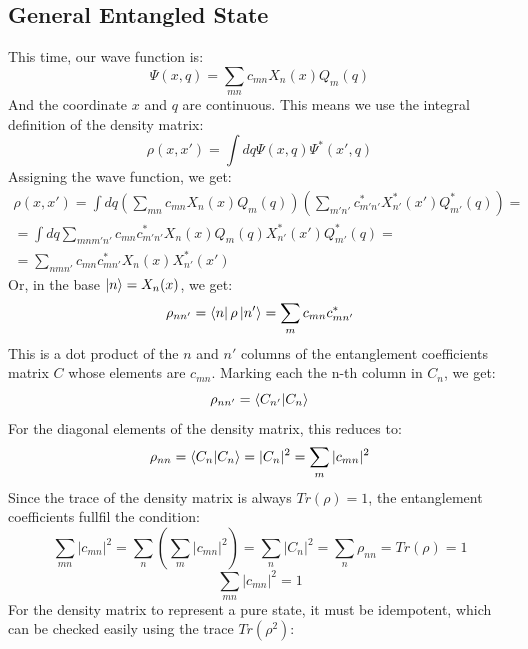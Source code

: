 \documentclass{article}
\begin{document}
\subsection{General Entangled State}
This time, our wave function is:
\begin{equation}
    \Psi(x, q) = \sum_{mn} c_{mn} X_n (x) Q_m (q)
\end{equation}
And the coordinate $x$ and $q$ are continuous. This means we use the integral definition of the density matrix:
\begin{equation}
    \rho(x,x') = \int dq \Psi(x, q) \Psi^* (x', q)
\end{equation}
Assigning the wave function, we get:
\begin{equation}
\begin{gathered}
    \rho(x,x') = \int dq \left(\sum_{mn} c_{mn} X_n (x) Q_m (q)\right) \left(\sum_{m'n'} c_{m'n'}^* X_{n'}^* (x') Q_{m'}^* (q)\right) = \\
    = \int dq \sum_{mnm'n'} c_{mn} c_{m'n'}^* X_n (x) Q_m (q) X_{n'}^* (x') Q_{m'}^* (q) = \\
    = \sum_{nmn'} c_{mn} c_{mn'}^* X_n (x) X_{n'}^* (x')
\end{gathered}
\end{equation}
Or, in the base $\ket{n} = X_n(x)$, we get:
\begin{equation}
    \rho_{nn'} = \bra{n}\rho\ket{n'} = \sum_{m} c_{mn}c^*_{mn'}
\end{equation}
This is a dot product of the $n$ and $n'$ columns of the entanglement coefficients matrix $C$ whose elements are $c_{mn}$. Marking each the n-th column in $C_n$, we get:
\begin{equation}
    \rho_{nn'} = \bra{C_{n'}}\ket{C_{n}}
\end{equation}
For the diagonal elements of the density matrix, this reduces to:
\begin{equation}
    \rho_{nn} = \bra{C_{n}}\ket{C_{n}} = |C_n|^2 = \sum_{m} |c_{mn}|^2
\end{equation}
Since the trace of the density matrix is always $Tr(\rho) = 1$, the entanglement coefficients fullfil the condition:
\begin{equation}
    \sum_{mn} |c_{mn}|^2 = \sum_{n} \left(\sum_{m}|c_{mn}|^2\right) = \sum_{n} |C_n|^2 = \sum_{n} \rho_{nn} = Tr(\rho) = 1
\end{equation}
\begin{equation}
    \sum_{mn} |c_{mn}|^2 = 1
\end{equation}
For the density matrix to represent a pure state, it must be idempotent, which can be checked easily using the trace $Tr(\rho^2)$:
\end{document}
